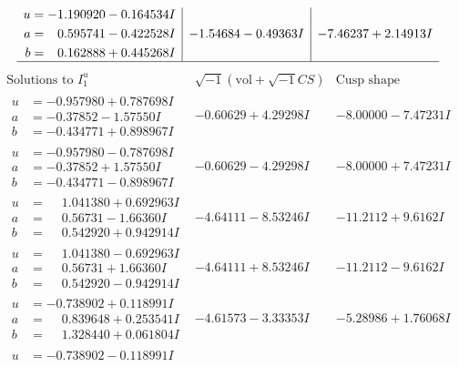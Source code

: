 \documentclass[1p]{elsarticle_modified}
\theoremstyle{definition}
\newcommand{\I}{\sqrt{-1}}
\begin{document}
$$\begin{array}{c|c|c}
\begin{aligned}
u &= -1.190920 - 0.164534 I \\
a &= \phantom{-}0.595741 - 0.422528 I \\
b &= \phantom{-}0.162888 + 0.445268 I\end{aligned}
 & -1.54684 - 0.49363 I & -7.46237 + 2.14913 I\\
 \hline 
 \end{array}$$\newpage$$\begin{array}{c|c|c}  
\text{Solutions to }I^u_{1}& \I (\text{vol} + \sqrt{-1}CS) & \text{Cusp shape}\\
 \hline 
\begin{aligned}
u &= -0.957980 + 0.787698 I \\
a &= -0.37852 - 1.57550 I \\
b &= -0.434771 + 0.898967 I\end{aligned}
 & -0.60629 + 4.29298 I & -8.00000 - 7.47231 I \\ \hline\begin{aligned}
u &= -0.957980 - 0.787698 I \\
a &= -0.37852 + 1.57550 I \\
b &= -0.434771 - 0.898967 I\end{aligned}
 & -0.60629 - 4.29298 I & -8.00000 + 7.47231 I \\ \hline\begin{aligned}
u &= \phantom{-}1.041380 + 0.692963 I \\
a &= \phantom{-}0.56731 - 1.66360 I \\
b &= \phantom{-}0.542920 + 0.942914 I\end{aligned}
 & -4.64111 - 8.53246 I & -11.2112 + 9.6162 I \\ \hline\begin{aligned}
u &= \phantom{-}1.041380 - 0.692963 I \\
a &= \phantom{-}0.56731 + 1.66360 I \\
b &= \phantom{-}0.542920 - 0.942914 I\end{aligned}
 & -4.64111 + 8.53246 I & -11.2112 - 9.6162 I \\ \hline\begin{aligned}
u &= -0.738902 + 0.118991 I \\
a &= \phantom{-}0.839648 + 0.253541 I \\
b &= \phantom{-}1.328440 + 0.061804 I\end{aligned}
 & -4.61573 - 3.33353 I & -5.28986 + 1.76068 I \\ \hline\begin{aligned}
u &= -0.738902 - 0.118991 I \\

\end{aligned}
\end{array}$$
\end{document}
